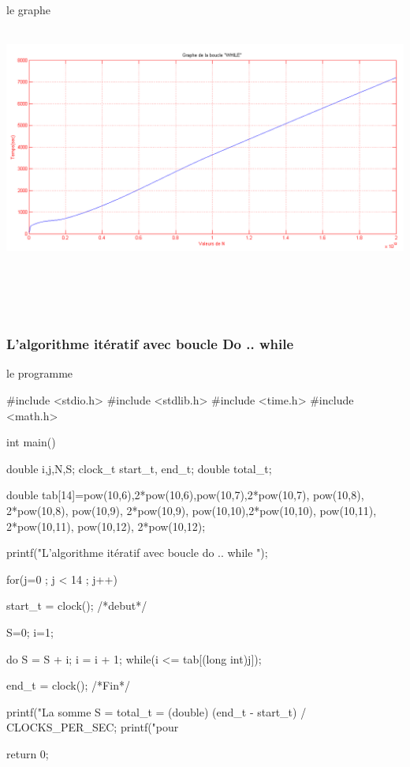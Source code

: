 \documentclass[•]{article}
\begin{document}
\textrm{  }
\\
\\

le graphe 

\textrm{  }
\\
\includegraphics[width=1\textwidth]{graphe/while.png}
\\
\\
\\
\\
\\
\subsubsection{L'algorithme itératif avec boucle Do .. while}
le programme
\begin{sql}
#include <stdio.h>
#include <stdlib.h>
#include <time.h>
#include <math.h>

 int main()
 {
	double i,j,N,S;
	clock_t start_t, end_t;
    double total_t;
	 
	double tab[14]={pow(10,6),2*pow(10,6),pow(10,7),2*pow(10,7), pow(10,8), 2*pow(10,8), pow(10,9), 2*pow(10,9), pow(10,10),2*pow(10,10), pow(10,11), 2*pow(10,11), pow(10,12), 2*pow(10,12)};

	printf("L'algorithme itératif avec boucle do .. while \n\n");

	for(j=0 ; j < 14 ; j++) {

        start_t = clock();			/*debut*/
        
        S=0; i=1;

        do
        {
            S = S + i;
            i = i + 1;
        } while(i <= tab[(long int)j]);

        end_t = clock();			/*Fin*/

        printf("La somme S = %
        total_t = (double) (end_t - start_t) / CLOCKS_PER_SEC;
        printf("pour %

    }
	return 0;
}
\end{sql}
\end{document}
